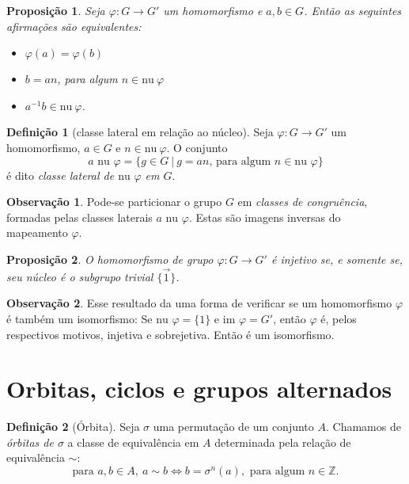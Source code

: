 \documentclass[a4paper,12pt]{report}
\theoremstyle{plain}
\newtheorem{proposicao}{Proposição}[section]
\theoremstyle{definition}
\newtheorem{definicao}{Definição}[section]
\newtheorem{observacao}{Observação}[section]
\begin{document}
\begin{proposicao}
	Seja \(\varphi: G\longrightarrow G'\) um
	homomorfismo e \(a,b \in G\). Então as seguintes afirmações são
	equivalentes:
	\begin{itemize}
		\item
		\(\varphi(a) = \varphi(b)\)
		\item
		\(b = an\), para algum \(n\in \text{nu} \ \varphi\)
		\item
		\(a^{-1}b \in \text{nu} \ \varphi\).
	\end{itemize}	
\end{proposicao}

\begin{definicao}[classe lateral em relação ao núcleo]
	Seja \(\varphi: G\longrightarrow G'\) um
	homomorfismo, \(a \in G\) e \(n\in\text{nu}\ \varphi\). O conjunto
	\[a\text{ nu }\varphi = \{g\in G \ | \ g = an \text{, para algum } n\in\text{nu }\varphi\}\] é dito \emph{classe lateral de \(\text{nu }\varphi\) em \(G\)}.	
\end{definicao}

\begin{observacao}
	Pode-se particionar o grupo \(G\) em \emph{classes de congruência},
	formadas pelas classes laterais \(a\text{ nu }\varphi\). Estas são imagens
	inversas do mapeamento \(\varphi\).
\end{observacao}

\begin{proposicao}
	O homomorfismo de grupo
	\(\varphi: G\longrightarrow G'\) é injetivo se, e somente se, seu núcleo
	é o subgrupo trivial \(\{\vec 1\}\).
\end{proposicao}

\begin{observacao}
	Esse resultado da uma forma de verificar se um homomorfismo \(\varphi\)
	é também um isomorfismo: Se \(\text{nu }\varphi = \{1\}\) e
	\(\text{im } \varphi = G'\), então \(\varphi\) é, pelos respectivos
	motivos, injetiva e sobrejetiva. Então é um isomorfismo.
\end{observacao}

\section{Orbitas, ciclos e grupos alternados}

\begin{definicao}[Órbita]\label{def:orbit}
	Seja $\sigma$ uma permutação de um conjunto $A$. Chamamos de \emph{órbitas de $\sigma$} a classe de equivalência em $A$ determinada pela relação de equivalência $\sim$:
	$$\text{para }a,b \in A,\ a\sim b \iff b=\sigma^n(a), \text{ para algum }n\in\mathbb{Z}.$$
\end{definicao}
\end{document}
